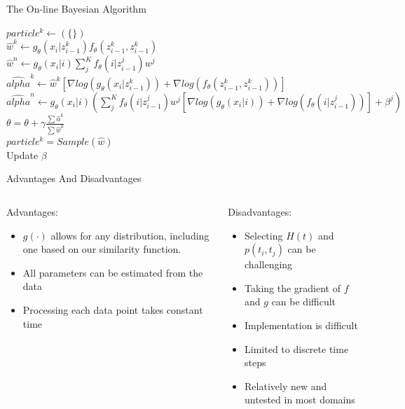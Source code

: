 \documentclass[compress]{beamer}
\begin{document}
\begin{frame}{The On-line Bayesian Algorithm}
\begin{algorithm}[H]
$particle^k \leftarrow (\{\})$ \\
 {
    $\hat{w}^k \leftarrow g_{\theta}(x_i | z_{i-1}^k) 
                            f_{\theta}(z_{i-1}^k, z_{i-1}^k)$ \\
    $\hat{w}^n \leftarrow g_{\theta}(x_i | i) 
                            \sum_j^K f_{\theta}(i |  z_{i-1}^j) 
                            w^j$ \\

    $\hat{alpha}^k \leftarrow \hat{w}^k 
                              [ \nabla log(g_{\theta}(x_i | z_{i-1}^k))  +
                                \nabla log(f_{\theta}(z_{i-1}^k, z_{i-1}^k))]$ \\
    $\hat{alpha}^n \leftarrow g_{\theta}(x_i | i)
                              (\sum_j^K f_{\theta}(i |  z_{i-1}^j) w^j
                               [ \nabla log( g_{\theta}(x_i | i) ) +
                                 \nabla log(f_{\theta}(i |  z_{i-1}^j))] + 
                                 \beta^j)$ \\
    $\theta = \theta + \gamma \frac{\sum \hat{\alpha}^k}{\sum \hat{w}^k} $\\
    $particle^k = Sample(\hat{w})$ \\
    Update $\beta$ \\
}

\end{algorithm}
\end{frame}

\begin{frame}{Advantages And Disadvantages}
\begin{columns}[t]
\begin{column}[1]{5cm}
Advantages:
\begin{itemize}
\item $g(\cdot)$ allows for any distribution, including one based on our
similarity function.
\item All parameters can be estimated from the data
\item Processing each data point takes constant time
\end{itemize}
\end{column}

\begin{column}[2]{5cm}
Disadvantages:
\begin{itemize}
\item Selecting $H(t)$ and $p(t_i, t_j)$ can be challenging
\item Taking the gradient of $f$ and $g$ can be difficult
\item Implementation is difficult
\item Limited to discrete time steps
\item Relatively new and untested in most domains
\end{itemize}
\end{column}

\end{columns}
\end{frame}
\end{document}
